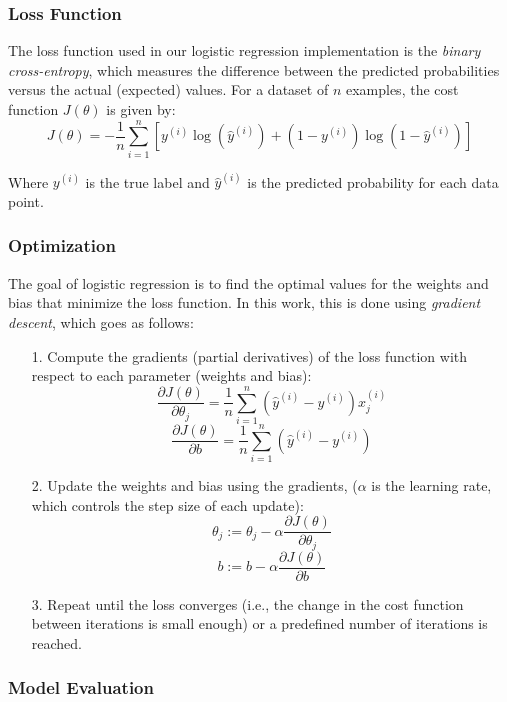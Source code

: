 \documentclass{article}
\theoremstyle{plain}
\theoremstyle{definition}
\theoremstyle{remark}
\begin{document}
\subsubsection{Loss Function}

The loss function used in our logistic regression implementation is the \textit{binary cross-entropy}, which measures the difference between the predicted probabilities versus the actual (expected) values. For a dataset of $n$ examples, the cost function $J(\theta)$ is given by:
$$
J(\theta) = -\frac{1}{n} \sum_{i=1}^{n} \left[ y^{(i)} \log(\hat{y}^{(i)}) + (1 - y^{(i)}) \log(1 - \hat{y}^{(i)}) \right]
$$

Where $y^{(i)}$ is the true label and $\hat{y}^{(i)}$ is the predicted probability for each data point.


\subsubsection{Optimization}

The goal of logistic regression is to find the optimal values for the weights and bias that minimize the loss function. In this work, this is done using \textit{gradient descent}, which goes as follows:

\begin{itemize}

\item[1.] Compute the gradients (partial derivatives) of the loss function with respect to each parameter (weights and bias):
$$
\frac{\partial J(\theta)}{\partial \theta_j} = \frac{1}{n} \sum_{i=1}^{n} \left( \hat{y}^{(i)} - y^{(i)} \right) x_j^{(i)}
$$
$$
\frac{\partial J(\theta)}{\partial b} = \frac{1}{n} \sum_{i=1}^{n} \left( \hat{y}^{(i)} - y^{(i)} \right)
$$

\item[2.] Update the weights and bias using the gradients, ($\alpha$ is the learning rate, which controls the step size of each update):
$$
\theta_j := \theta_j - \alpha \frac{\partial J(\theta)}{\partial \theta_j}
$$
$$
b := b - \alpha \frac{\partial J(\theta)}{\partial b}
$$

\item[3.] Repeat until the loss converges (i.e., the change in the cost function between iterations is small enough) or a predefined number of iterations is reached.

\end{itemize}


\subsubsection{Model Evaluation}
\end{document}
